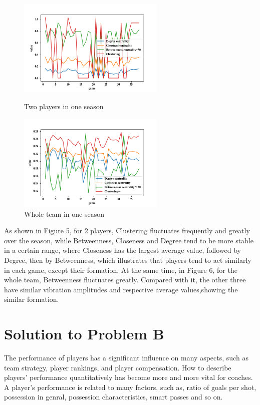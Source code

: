 \documentclass{mcmthesis}
\begin{document}
\begin{figure}[h]
	\begin{minipage}[t]{0.5\textwidth}
		\centering
		\includegraphics[width=7cm]{value_of_graph_one_season_2_players.png}
		\caption{Two players in one season\label{fig:aa}}
	\end{minipage}
	\qquad
	\begin{minipage}[t]{0.5\textwidth}
		\centering
		\includegraphics[width=7cm]{value_of_graph_one_season.png}
		\caption{Whole team in one season\label{fig:aa}}
	\end{minipage}
\end{figure}

As shown in Figure 5, for 2 players, Clustering fluctuates frequently and greatly over the season, while Betweenness, Closeness and Degree tend to be more stable in a certain range, where Closeness has the largest average value, followed by Degree, then by Betweenness, which illustrates that players tend to act similarly in each game, except their formation. At the same time, in Figure 6, for the whole team, Betweenness fluctuates greatly. Compared with it, the other three have similar vibration amplitudes and respective average values,showing the similar formation.

\section{ Solution to Problem B }
The performance of players has a significant influence on many aspects, such as team strategy, player rankings, and player compensation. How to describe players' performance quantitatively has become more and more vital for coaches. A player's performance is related to many factors, such as, ratio of goals per shot, possession in genral, possession characteristics, smart passes and so on.
\end{document}

